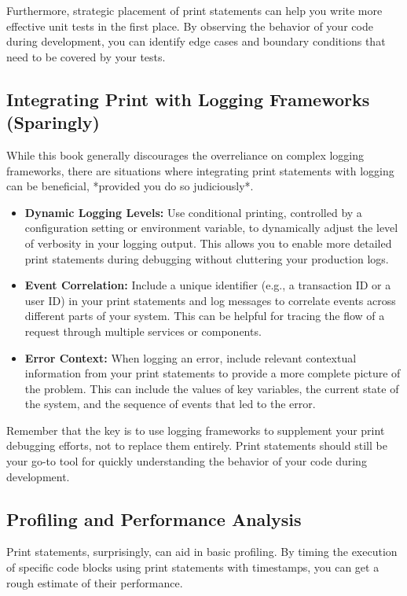 \documentclass{article}
\begin{document}
{{{{Furthermore, strategic placement of print statements can help you write more effective unit tests in the first place. By observing the behavior of your code during development, you can identify edge cases and boundary conditions that need to be covered by your tests.

\subsection*{Integrating Print with Logging Frameworks (Sparingly)}

While this book generally discourages the overreliance on complex logging frameworks, there are situations where integrating print statements with logging can be beneficial, *provided you do so judiciously*.

\begin{itemize}
    \item \textbf{Dynamic Logging Levels:} Use conditional printing, controlled by a configuration setting or environment variable, to dynamically adjust the level of verbosity in your logging output. This allows you to enable more detailed print statements during debugging without cluttering your production logs.
    \item \textbf{Event Correlation:} Include a unique identifier (e.g., a transaction ID or a user ID) in your print statements and log messages to correlate events across different parts of your system. This can be helpful for tracing the flow of a request through multiple services or components.
    \item \textbf{Error Context:} When logging an error, include relevant contextual information from your print statements to provide a more complete picture of the problem. This can include the values of key variables, the current state of the system, and the sequence of events that led to the error.
\end{itemize}

Remember that the key is to use logging frameworks to supplement your print debugging efforts, not to replace them entirely. Print statements should still be your go-to tool for quickly understanding the behavior of your code during development.

\subsection*{Profiling and Performance Analysis}

Print statements, surprisingly, can aid in basic profiling. By timing the execution of specific code blocks using print statements with timestamps, you can get a rough estimate of their performance.

}}}}
\end{document}
